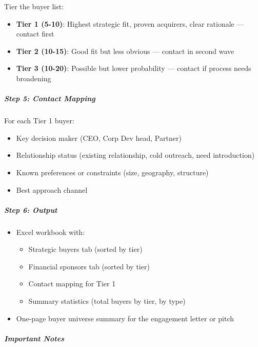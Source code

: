 \documentclass[11pt]{article}
\begin{document}
Tier the buyer list:


\begin{itemize}[leftmargin=*,itemsep=2pt,topsep=2pt]
\item {} \textbf{Tier 1 (5-10)}: Highest strategic fit, proven acquirers, clear rationale — contact first
\item {} \textbf{Tier 2 (10-15)}: Good fit but less obvious — contact in second wave
\item {} \textbf{Tier 3 (10-20)}: Possible but lower probability — contact if process needs broadening
\end{itemize}

\subparagraph{Step 5: Contact Mapping}\mbox{}\par

For each Tier 1 buyer:

\begin{itemize}[leftmargin=*,itemsep=2pt,topsep=2pt]
\item {} Key decision maker (CEO, Corp Dev head, Partner)
\item {} Relationship status (existing relationship, cold outreach, need introduction)
\item {} Known preferences or constraints (size, geography, structure)
\item {} Best approach channel
\end{itemize}

\subparagraph{Step 6: Output}\mbox{}\par

\begin{itemize}[leftmargin=*,itemsep=2pt,topsep=2pt]
\item {} Excel workbook with:
\begin{itemize}[leftmargin=*,itemsep=2pt,topsep=2pt]
\item {} Strategic buyers tab (sorted by tier)
\item {} Financial sponsors tab (sorted by tier)
\item {} Contact mapping for Tier 1
\item {} Summary statistics (total buyers by tier, by type)
\end{itemize}
\item {} One-page buyer universe summary for the engagement letter or pitch
\end{itemize}

\subparagraph{Important Notes}\mbox{}\par
\end{document}
